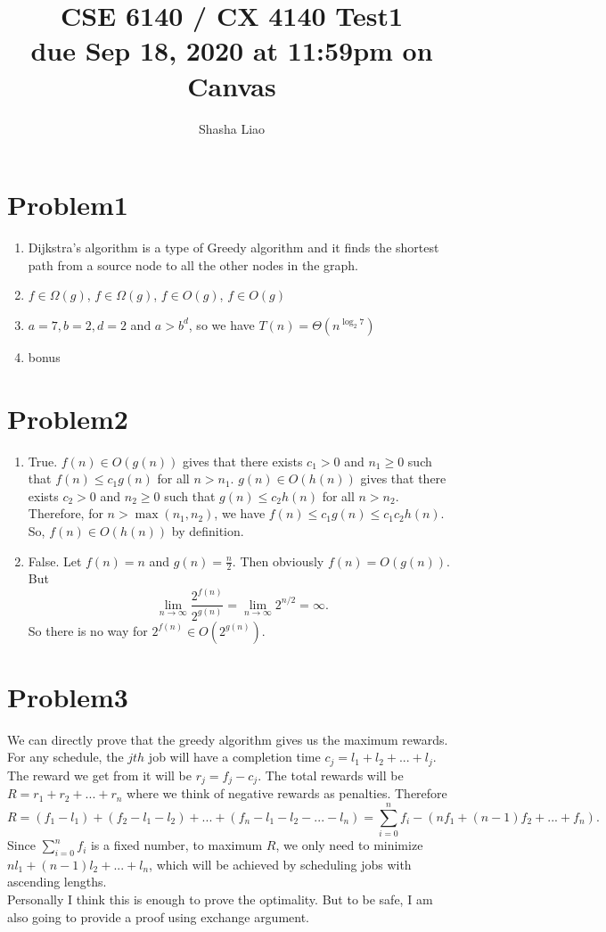 \documentclass{article}
\title{CSE 6140 / CX 4140 Test1\\due Sep 18, 2020 at 11:59pm on Canvas }
\author{Shasha Liao}
\date{}
\begin{document}
\maketitle

\section{Problem1}
\begin{enumerate}
\item Dijkstra's algorithm is a type of Greedy algorithm and it finds the shortest path from a source node to all the other nodes in the graph.
\item $f \in \Omega(g)$, $f \in \Omega(g)$, $f \in O(g)$, $f \in O(g)$
\item $a=7, b = 2, d = 2$ and $a > b^d$, so we have $T(n) = \Theta (n^{\log_2 7})$
\item bonus
\end{enumerate}

\section{Problem2}
\begin{enumerate}
\item True. $f(n) \in O(g(n))$ gives that there exists $c_1 > 0$ and $n_1 \geq 0$ such that $f(n) \leq c_1 g(n)$ for all $n > n_1$. $g(n) \in O(h(n))$ gives that there exists $c_2 > 0$ and $n_2 \geq 0$ such that $g(n) \leq c_2 h(n)$ for all $n > n_2$. Therefore, for $n > \max(n_1, n_2)$, we have $f(n) \leq c_1 g(n) \leq c_1c_2h(n)$. So, $f(n) \in O(h(n))$ by definition.

\item False. Let $f(n) = n$ and $g(n) = \frac n 2$. Then obviously $f(n) = O(g(n))$. But $$\lim_{n\rightarrow \infty}\frac{2^{f(n)}}{2^{g(n)}} = \lim_{n\rightarrow \infty} 2^{n/2} = \infty.$$ So there is no way for $2^{f(n)} \in O(2^{g(n)})$.

\end{enumerate}

\section{Problem3}
We can directly prove that the greedy algorithm gives us the maximum rewards. For any schedule, the $jth$ job will have a completion time $c_j = l_1 + l_2 + ... + l_j$. The reward we get from it will be $r_j = f_j - c_j$. The total rewards will be $R = r_1 + r_2 + ... + r_n$ where we think of negative rewards as penalties. Therefore $$R = (f_1 - l_1) + (f_2 - l_1 - l_2) + ... + (f_n - l_1 -l_2 - ... - l_n) = \sum_{i=0}^{n}f_i - (nf_1 + (n-1)f_2 + ... + f_n).$$ Since $\sum_{i=0}^{n}f_i$ is a fixed number, to maximum $R$, we only need to minimize $nl_1 + (n-1)l_2 + ... + l_n$, which will be achieved by scheduling jobs with ascending lengths. \\
\break
Personally I think this is enough to prove the optimality. But to be safe, I am also going to provide a proof using exchange argument. 
\end{document}
